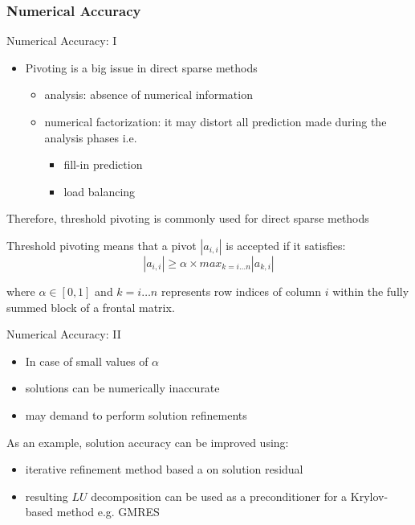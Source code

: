 \subsubsection{Numerical Accuracy}


\begin{frame}[t]{Numerical Accuracy: I}
	\small
	\begin{itemize}
		\item Pivoting is a big issue in direct sparse methods
		\begin{itemize}
			\item analysis: absence of numerical information
			
			\item numerical factorization: it may distort all prediction made during the analysis phases i.e.
			\begin{itemize}
				\item fill-in prediction
				\item load balancing
			\end{itemize}
		\end{itemize}
	\end{itemize}

	\begin{center}
		Therefore, threshold pivoting is commonly used for direct sparse methods
	\end{center}

	Threshold pivoting means that a pivot $|a_{i,i}|$ is accepted if it satisfies:\\
	
	\begin{equation}\label{eq:lc-1}
		|a_{i,i}| \geq \alpha \times max_{k=i \dots n} |a_{k,i}|
	\end{equation}
	
	where $\alpha \in [0,1]$ and $k=i \dots n$ represents row indices of column $i$ within the fully summed block of a frontal matrix.\\
	
\end{frame}



\begin{frame}[t]{Numerical Accuracy: II}
	\small
	\begin{itemize}
		\item In case of small values of $\alpha$
		
		\item solutions can be numerically inaccurate
		\item may demand to perform solution refinements 
	\end{itemize}

	\vspace{5mm}
	As an example, solution accuracy can be improved using:
	\begin{itemize}
		\item  iterative refinement method based a on solution residual
		
		\item  resulting $LU$ decomposition can be used as a preconditioner for a Krylov-based method e.g. GMRES
	\end{itemize}
\end{frame}
